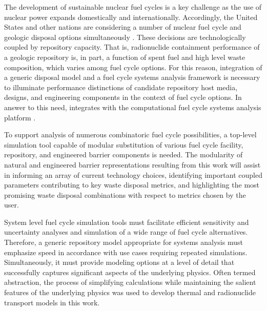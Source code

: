 
The development of sustainable nuclear fuel cycles is a key challenge as the 
use of nuclear power expands domestically and internationally.  Accordingly, 
the United States and other nations are considering a number of nuclear fuel 
cycle and geologic disposal options simultaneously \cite{doe_strategy_2013, 
von_lensa_red-impact_2008}.  These decisions 
are technologically coupled by repository capacity. That is, 
radionuclide containment performance of a geologic repository is, in part, a function of 
spent fuel and high level waste composition, which varies among fuel cycle 
options. For this reason, integration of a generic disposal model and a fuel 
cycle systems analysis framework is necessary to illuminate performance 
distinctions of candidate repository host media, designs, and engineering 
components in the context of fuel cycle options.  In answer to this need, \Cyder 
integrates with the \Cyclus computational fuel cycle systems analysis platform 
\cite{huff_cyder_2013,wilson_cyclus:_2012}. 



To support analysis of numerous combinatoric fuel cycle possibilities, a 
top-level simulation tool capable of modular substitution of various fuel cycle 
facility, repository, and engineered barrier components is needed. The 
modularity of natural and engineered barrier representations resulting from this 
work will assist in informing an array of current technology choices, 
identifying important coupled parameters contributing to key waste disposal 
metrics, and highlighting the most promising waste disposal combinations with 
respect to metrics chosen by the user. 


System level fuel cycle simulation tools must facilitate efficient sensitivity 
and uncertainty analyses and simulation of a wide range of fuel cycle 
alternatives. Therefore, a generic repository model appropriate for systems 
analysis must emphasize speed in accordance with use cases requiring repeated 
simulations. Simultaneously, it must provide modeling options at a level of 
detail that successfully captures significant aspects of the underlying 
physics.  Often termed abstraction, the process of simplifying calculations while 
maintaining the salient features of the underlying physics 
was used to develop thermal and radionuclide transport models in this work. 

